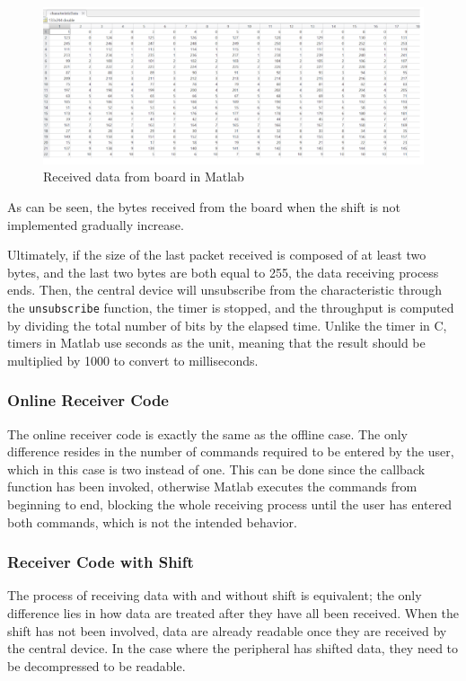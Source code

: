 \documentclass{Configuration_Files/PoliMi3i_thesis}
\begin{document}
\begin{figure}[H]
    \centering
    \includegraphics[scale=0.6]{Board Windows PC/6.png}
    \caption{Received data from board in Matlab}
    \label{Boardwindows_6}
\end{figure}

As can be seen, the bytes received from the board when the shift is not implemented gradually increase.

Ultimately, if the size of the last packet received is composed of at least two bytes, and the last two bytes are both equal to 255, the data receiving process ends. Then, the central device will unsubscribe from the characteristic through the \texttt{unsubscribe} function, the timer is stopped, and the throughput is computed by dividing the total number of bits by the elapsed time. Unlike the timer in C, timers in Matlab use seconds as the unit, meaning that the result should be multiplied by 1000 to convert to milliseconds.

\subsubsection{Online Receiver Code}

The online receiver code is exactly the same as the offline case. The only difference resides in the number of commands required to be entered by the user, which in this case is two instead of one. This can be done since the callback function has been invoked, otherwise Matlab executes the commands from beginning to end, blocking the whole receiving process until the user has entered both commands, which is not the intended behavior.

\subsubsection{Receiver Code with Shift}

The process of receiving data with and without shift is equivalent; the only difference lies in how data are treated after they have all been received. When the shift has not been involved, data are already readable once they are received by the central device. In the case where the peripheral has shifted data, they need to be decompressed to be readable.
\end{document}
